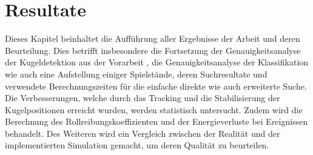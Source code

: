 \chapter{Resultate}\label{kap:resultate}
Dieses Kapitel beinhaltet die Aufführung aller Ergebnisse der Arbeit und deren Beurteilung.
Dies betrifft insbesondere die Fortsetzung der Genauigkeitsanalyse der Kugeldetektion aus der Vorarbeit \cite{project2:resultate},
die Genauigkeitsanalyse der Klassifikation wie auch eine Aufstellung einiger Spielstände,
deren Suchresultate und verwendete Berechnungszeiten für die einfache direkte wie auch erweiterte Suche.
Die Verbesserungen, welche durch das Tracking und die Stabilisierung der Kugelpositionen erreicht wurden, werden statistisch untersucht.
Zudem wird die Berechnung des Rollreibungskoeffizienten und der Energieverluste bei Ereignissen behandelt.
Des Weiteren wird ein Vergleich zwischen der Realität und der implementierten Simulation gemacht, um deren Qualität zu beurteilen.





\clearpage

\newpage


